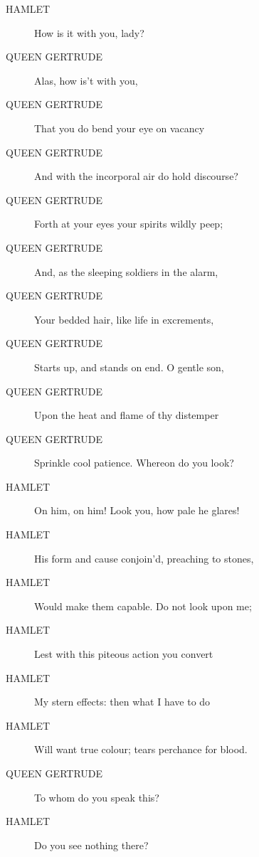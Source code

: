 \documentclass{article}
\begin{document}
\begin{description}
            
\item[HAMLET] How is it with you, lady?
\end{description}
          
\begin{description}
            
\item[QUEEN GERTRUDE] Alas, how is't with you,
\item[QUEEN GERTRUDE] That you do bend your eye on vacancy
\item[QUEEN GERTRUDE] And with the incorporal air do hold discourse?
\item[QUEEN GERTRUDE] Forth at your eyes your spirits wildly peep;
\item[QUEEN GERTRUDE] And, as the sleeping soldiers in the alarm,
\item[QUEEN GERTRUDE] Your bedded hair, like life in excrements,
\item[QUEEN GERTRUDE] Starts up, and stands on end. O gentle son,
\item[QUEEN GERTRUDE] Upon the heat and flame of thy distemper
\item[QUEEN GERTRUDE] Sprinkle cool patience. Whereon do you look?
\end{description}
          
\begin{description}
            
\item[HAMLET] On him, on him! Look you, how pale he glares!
\item[HAMLET] His form and cause conjoin'd, preaching to stones,
\item[HAMLET] Would make them capable. Do not look upon me;
\item[HAMLET] Lest with this piteous action you convert
\item[HAMLET] My stern effects: then what I have to do
\item[HAMLET] Will want true colour; tears perchance for blood.
\end{description}
          
\begin{description}
            
\item[QUEEN GERTRUDE] To whom do you speak this?
\end{description}
          
\begin{description}
            
\item[HAMLET] Do you see nothing there?
\end{description}
          
\end{document}
